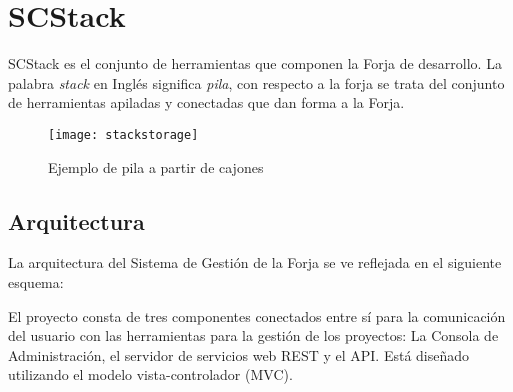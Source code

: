\chapter{SCStack}
\label{chap:scstack}

\par SCStack es el conjunto de herramientas que componen la Forja de desarrollo. La palabra \emph{stack} en Inglés significa \emph{pila}, con respecto a la forja se trata del conjunto de herramientas apiladas y conectadas que dan forma a la Forja.

\begin{figure}[H]
\centering
\texttt{[image: stackstorage]}
\caption{Ejemplo de pila a partir de cajones}
\label{fig:stackstorage}
\end{figure}

\section{Arquitectura}
\label{sec:arquitectura}

\par La arquitectura del Sistema de Gestión de la Forja se ve reflejada en el siguiente esquema:


\par El proyecto consta de tres componentes conectados entre sí para la comunicación del usuario con las herramientas para la gestión de los proyectos: La Consola de Administración, el servidor de servicios web REST y el API. Está diseñado utilizando el modelo vista-controlador (MVC).

